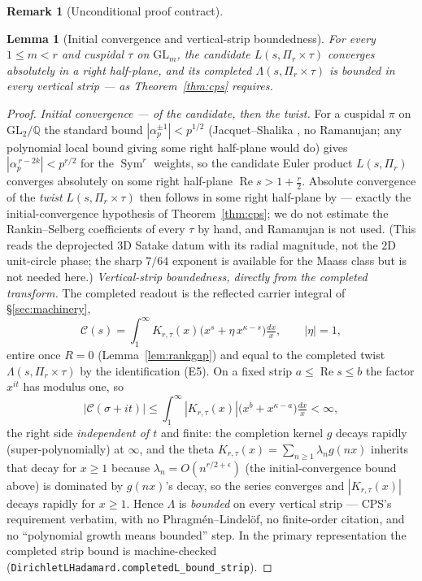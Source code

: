 \documentclass[11pt]{article}
\newtheorem{lemma}[theorem]{Lemma}
\theoremstyle{definition}
\newtheorem{remark}[theorem]{Remark}
\renewcommand{\Re}{\operatorname{Re}}
\newcommand{\Sym}{\operatorname{Sym}}
\begin{document}
\begin{remark}[Unconditional proof contract]
\begin{enumerate}
\begin{lemma}[Initial convergence and vertical-strip boundedness]\label{lem:bounded}
For every $1\le m<r$ and cuspidal $\tau$ on $\mathrm{GL}_m$, the candidate $L(s,\Pi_r\times\tau)$ converges
absolutely in a right half-plane, and its completed $\Lambda(s,\Pi_r\times\tau)$ is bounded in every vertical
strip --- as Theorem~\ref{thm:cps} requires.
\end{lemma}

\begin{proof}
\emph{Initial convergence --- of the candidate, then the twist.} For a cuspidal $\pi$ on
$\mathrm{GL}_2/\mathbb Q$ the standard bound $|\alpha_p^{\pm1}|<p^{1/2}$ (Jacquet--Shalika \cite{JS}, no
Ramanujan; any polynomial local bound giving some right half-plane would do) gives $|\alpha_p^{\,r-2k}|<p^{r/2}$
for the $\Sym^r$ weights, so the candidate Euler product
$L(s,\Pi_r)$ converges absolutely on some right half-plane $\Re s>1+\tfrac r2$. Absolute convergence of the
\emph{twist} $L(s,\Pi_r\times\tau)$ then follows in some right half-plane by \cite[Lemma~2.2]{CPS} --- exactly
the initial-convergence hypothesis of Theorem~\ref{thm:cps}; we do not estimate the Rankin--Selberg
coefficients of every $\tau$ by hand, and Ramanujan is not used. (This reads the deprojected $3$D Satake datum
with its radial magnitude, not the $2$D unit-circle phase; the sharp $7/64$ exponent \cite{KimSarnak} is
available for the Maass class but is not needed here.)
\emph{Vertical-strip boundedness, directly from the completed transform.} The completed readout is the
reflected carrier integral of \S\ref{sec:machinery},
\[
  \mathcal C(s)=\int_1^\infty K_{r,\tau}(x)\bigl(x^{s}+\eta\,x^{\kappa-s}\bigr)\tfrac{dx}{x},\qquad|\eta|=1,
\]
entire once $R=0$ (Lemma~\ref{lem:rankgap}) and equal to the completed twist $\Lambda(s,\Pi_r\times\tau)$ by
the identification \textup{(E5)}. On a fixed strip $a\le\Re s\le b$ the factor $x^{it}$ has modulus one, so
\[
  |\mathcal C(\sigma+it)|\le\int_1^\infty|K_{r,\tau}(x)|\bigl(x^{b}+x^{\kappa-a}\bigr)\tfrac{dx}{x}<\infty,
\]
the right side \emph{independent of $t$} and finite: the completion kernel $g$ decays rapidly (super-polynomially)
at $\infty$, and the theta $K_{r,\tau}(x)=\sum_{n\ge1}\lambda_n g(nx)$ inherits that decay for $x\ge1$ because
$\lambda_n=O(n^{r/2+\epsilon})$ (the initial-convergence bound above) is dominated by $g(nx)$'s decay, so the
series converges and $|K_{r,\tau}(x)|$ decays rapidly for $x\ge1$. Hence $\Lambda$ is \emph{bounded} on every
vertical strip --- CPS's requirement verbatim,
with no Phragm\'en--Lindel\"of, no finite-order citation, and no ``polynomial growth means bounded'' step. In
the primary representation the completed strip bound is machine-checked
(\texttt{DirichletLHadamard.completedL\_bound\_strip}).
\end{proof}


\end{enumerate}
\end{remark}
\end{document}
